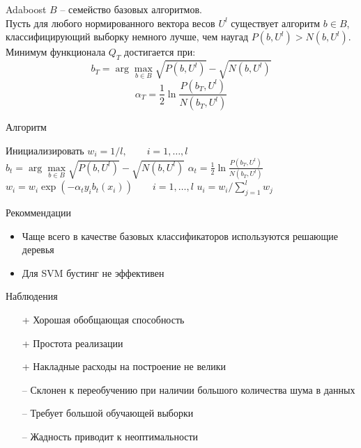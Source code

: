 \documentclass[10pt]{beamer}
\begin{document}
\begin{frame}{Adaboost}
  $B$ -- семейство базовых алгоритмов.\\
  \bigbreak
  Пусть для любого нормированного вектора весов $U^l$ существует алгоритм $b \in B$, классифицирующий выборку немного лучше, чем наугад $P(b, U^l) > N (b, U^l)$. \\
  Минимум функционала $Q_T$ достигается при:\\
  $$b_T = \arg\max\limits_{b \in B} \sqrt{P(b, U^l)} - \sqrt{N(b, U^l)}$$
  $$\alpha_T = \frac{1}{2} \ln \frac{P(b_T, U^l)}{N(b_T, U^l)}$$
\end{frame}

\begin{frame}{Алгоритм}
  \begin{algorithmic}[1]
      \State Инициализировать $w_i = 1 / l, \qquad i=1, \dots, l$
        \State $b_t = \arg\max\limits_{b \in B} \sqrt{P(b, U^l)} - \sqrt{N(b, U^l)}$
        \State $\alpha_t = \frac{1}{2} \ln \frac{P(b_T, U^l)}{N(b_T, U^l)}$
        \State $w_i = w_i \exp (- \alpha_t y_i b_t(x_i)) \qquad i=1, \dots, l$
        \State $u_i = w_i / \sum\limits_{j=1}^l w_j$
      \EndFor
    \EndFunction
  \end{algorithmic}
\end{frame}

\begin{frame}{Рекоммендации}
  \begin{itemize}
    \item Чаще всего в качестве базовых классификаторов используются решающие деревья
    \item Для SVM бустинг не эффективен     
  \end{itemize}
\end{frame}

\begin{frame}{Наблюдения}
  \begin{itemize}[<+->]
    \item[+] Хорошая обобщающая способность
    \item[+] Простота реализации
    \item[+] Накладные расходы на построение не велики
    \bigbreak
    \item[--] Склонен к переобучению при наличии большого количества шума в данных
    \item[--] Требует большой обучающей выборки
    \item[--] Жадность приводит к неоптимальности
  \end{itemize}
\end{frame}
\end{document}
